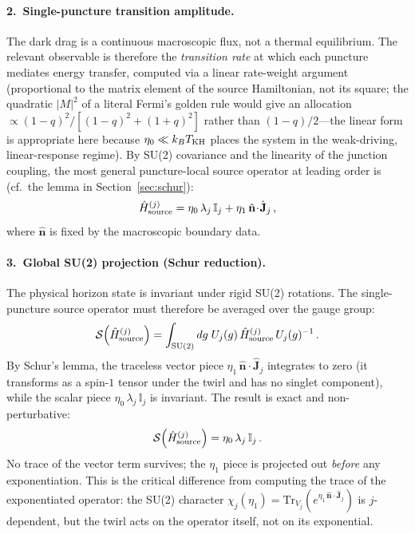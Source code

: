 \documentclass[aps,prd,twocolumn,10pt,superscriptaddress,nofootinbib]{revtex4-2}
\begin{document}
\paragraph{2.\ Single-puncture transition amplitude.}

The dark drag is a continuous macroscopic flux, not a thermal
equilibrium.  The relevant observable is therefore the
\emph{transition rate} at which each puncture mediates energy
transfer, computed via a linear rate-weight argument (proportional to
the matrix element of the source Hamiltonian, not its square;
the quadratic $|M|^2$ of a literal Fermi's golden rule would
give an allocation $\propto (1-q)^2/[(1-q)^2+(1+q)^2]$ rather
than $(1-q)/2$---the linear form is appropriate here because
$\eta_0 \ll k_BT_{\rm KH}$ places the system in the weak-driving,
linear-response regime).  By SU(2)
covariance and the linearity of the junction coupling, the most
general puncture-local source operator at leading order is
(cf.\ the lemma in Section~\ref{sec:schur}):
\begin{equation}
\hat{H}^{(j)}_{\rm source}
  = \eta_0\,\lambda_j\,\mathbb{I}_j
    + \eta_1\,\hat{\mathbf{n}}\!\cdot\!\hat{\mathbf{J}}_j\,,
\label{eq:Hsource_PI}
\end{equation}
where $\hat{\mathbf{n}}$ is fixed by the macroscopic boundary
data.

\paragraph{3.\ Global SU(2) projection (Schur reduction).}

The physical horizon state is invariant under rigid SU(2)
rotations.  The single-puncture source operator must therefore be
averaged over the gauge group:
\begin{equation}
\mathcal{S}\!\left(\hat{H}^{(j)}_{\rm source}\right)
  = \int_{\mathrm{SU}(2)} dg\;
    U_j(g)\,\hat{H}^{(j)}_{\rm source}\,U_j(g)^{-1}\,.
\label{eq:twirl_PI}
\end{equation}
By Schur's lemma, the traceless vector piece
$\eta_1\,\hat{\mathbf{n}}\!\cdot\!\hat{\mathbf{J}}_j$ integrates
to zero (it transforms as a spin-$1$ tensor under the twirl and
has no singlet component), while the scalar piece
$\eta_0\,\lambda_j\,\mathbb{I}_j$ is invariant.  The result is
exact and non-perturbative:
\begin{equation}
\mathcal{S}\!\left(\hat{H}^{(j)}_{\rm source}\right)
  = \eta_0\,\lambda_j\,\mathbb{I}_j\,.
\label{eq:schur_PI_result}
\end{equation}
No trace of the vector term survives; the $\eta_1$ piece is
projected out \emph{before} any exponentiation.  This is the
critical difference from computing the trace of the exponentiated
operator: the SU(2) character
$\chi_j(\eta_1) = \mathrm{Tr}_{V_j}(e^{\eta_1\,
\hat{\mathbf{n}}\cdot\hat{\mathbf{J}}_j})$ is $j$-dependent, but
the twirl acts on the operator itself, not on its exponential.
\end{document}
